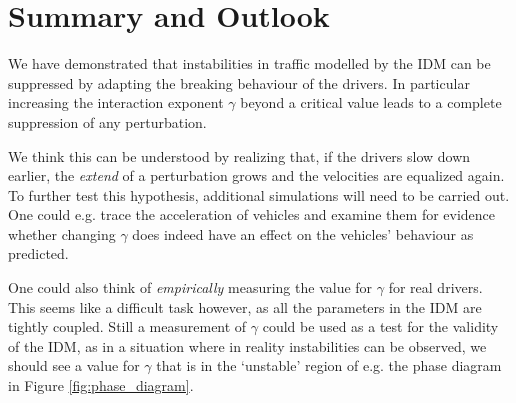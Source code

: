 \section{Summary and Outlook}

We have demonstrated that instabilities in traffic modelled by the IDM can be suppressed by adapting the breaking behaviour of the drivers. In particular increasing the interaction exponent $\gamma$ beyond a critical value leads to a complete suppression of any perturbation.

We think this can be understood by realizing that, if the drivers slow down earlier, the \emph{extend} of a perturbation grows and the velocities are equalized again. To further test this hypothesis, additional simulations will need to be carried out. One could e.g. trace the acceleration of vehicles and examine them for evidence whether changing $\gamma$ does indeed have an effect on the vehicles' behaviour as predicted.

One could also think of \emph{empirically} measuring the value for $\gamma$ for real drivers. This seems like a difficult task however, as all the parameters in the IDM are tightly coupled. Still a measurement of $\gamma$ could be used as a test for the validity of the IDM, as in a situation where in reality instabilities can be observed, we should see a value for $\gamma$ that is in the `unstable' region of e.g. the phase diagram in Figure \ref{fig:phase_diagram}.